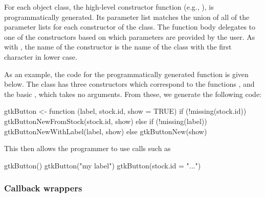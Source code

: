 \documentclass[article,shortnames]{jss}
\begin{document}
For each object class, the high-level constructor function (e.g.,
), is programmatically generated. Its parameter list
matches the union of all of the parameter lists for each constructor
of the class. The function body delegates to one of the constructors
based on which parameters are provided by the user. As with
, the name of the constructor is the name
of the class with the first character in lower case. 

As an example, the code for the programmatically generated
 function is given below.  The 
class has three constructors which correspond to the functions
,
 and the basic ,
which takes no arguments. From these, we generate the following code:
\begin{Code}
gtkButton <- function (label, stock.id, show = TRUE) 
{
    if (!missing(stock.id)) {
        gtkButtonNewFromStock(stock.id, show)
    }
    else {
        if (!missing(label)) {
            gtkButtonNewWithLabel(label, show)
        }
        else {
            gtkButtonNew(show)
        }
    }
}
\end{Code}
This then allows the  programmer to use calls such as
\begin{Code}
gtkButton()
gtkButton("my label")
gtkButton(stock.id = "...")
\end{Code}

\subsubsection{Callback wrappers}
%

\end{document}
